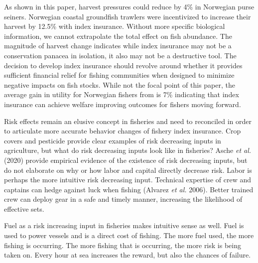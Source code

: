 \documentclass[
  letterpaper,
  DIV=11,
  numbers=noendperiod]{scrartcl}
\theoremstyle{plain}
\theoremstyle{plain}
\theoremstyle{remark}
\begin{document}
As shown in this paper, harvest pressures could reduce by 4\% in
Norwegian purse seiners. Norwegian coastal groundfish trawlers were
incentivized to increase their harvest by 12.5\% with index insurance.
Without more specific biological information, we cannot extrapolate the
total effect on fish abundance. The magnitude of harvest change
indicates while index insurance may not be a conservation panacea in
isolation, it also may not be a destructive tool. The decision to
develop index insurance should revolve around whether it provides
sufficient financial relief for fishing communities when designed to
minimize negative impacts on fish stocks. While not the focal point of
this paper, the average gain in utility for Norwegian fishers from is
7\% indicating that index insurance can achieve welfare improving
outcomes for fishers moving forward.

Risk effects remain an elusive concept in fisheries and need to
reconciled in order to articulate more accurate behavior changes of
fishery index insurance. Crop covers and pesticide provide clear
examples of risk decreasing inputs in agriculture, but what do risk
decreasing inputs look like in fisheries? Asche \emph{et al.} (2020)
provide empirical evidence of the existence of risk decreasing inputs,
but do not elaborate on why or how labor and capital directly decrease
risk. Labor is perhaps the more intuitive risk decreasing input.
Technical expertise of crew and captains can hedge against luck when
fishing (Alvarez \emph{et al.} 2006). Better trained crew can deploy
gear in a safe and timely manner, increasing the likelihood of effective
sets.

Fuel as a risk increasing input in fisheries makes intuitive sense as
well. Fuel is used to power vessels and is a direct cost of fishing. The
more fuel used, the more fishing is occurring. The more fishing that is
occurring, the more risk is being taken on. Every hour at sea increases
the reward, but also the chances of failure.
\end{document}
